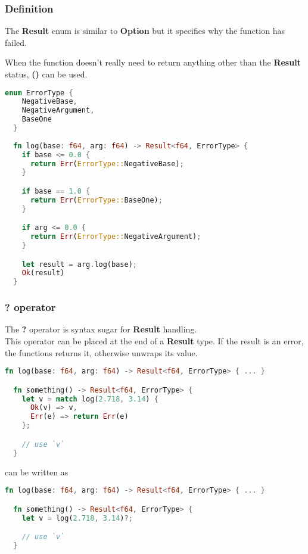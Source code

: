 \documentclass[a4paper]{article}
\begin{document}
\subsubsection{Definition}

The \textbf{Result} enum is similar to \textbf{Option} but it
specifies why the function has failed.

When the function doesn't really need to return anything other than the
\textbf{Result} status, \textbf{()} can be used.

\begin{lstlisting}[language=Rust, style=boxed, numbers=none]
  enum ErrorType {
    NegativeBase,
    NegativeArgument,
    BaseOne
  }
  
  fn log(base: f64, arg: f64) -> Result<f64, ErrorType> {
    if base <= 0.0 {
      return Err(ErrorType::NegativeBase);
    }

    if base == 1.0 {
      return Err(ErrorType::BaseOne);
    }

    if arg <= 0.0 {
      return Err(ErrorType::NegativeArgument);
    }

    let result = arg.log(base);
    Ok(result)
  }
\end{lstlisting}

\pagebreak

\subsubsection{? operator}

The \textbf{?} operator is syntax sugar for \textbf{Result} handling. \\
This operator can be placed at the end of a \textbf{Result} type.
If the result is an error, the functions returns it, otherwise unwraps
its value.

\begin{lstlisting}[language=Rust, style=boxed, numbers=none]
  fn log(base: f64, arg: f64) -> Result<f64, ErrorType> { ... }

  fn something() -> Result<f64, ErrorType> {
    let v = match log(2.718, 3.14) {
      Ok(v) => v,
      Err(e) => return Err(e)
    };

    // use `v`
  }
\end{lstlisting}

can be written as

\begin{lstlisting}[language=Rust, style=boxed, numbers=none]
  fn log(base: f64, arg: f64) -> Result<f64, ErrorType> { ... }

  fn something() -> Result<f64, ErrorType> {
    let v = log(2.718, 3.14)?;

    // use `v`
  }
\end{lstlisting}
\end{document}
